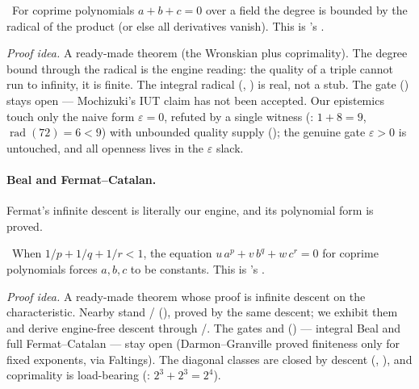 \begin{theorem}\label{thm:polynomial_abc_shadow}
\green{}\ For coprime polynomials $a+b+c=0$ over a field the degree is bounded by the radical of the
product (or else all derivatives vanish). This is 's .
\end{theorem}

\emph{Proof idea.} A ready-made  theorem (the Wronskian plus coprimality). The degree
bound through the radical is the engine reading: the quality of a triple cannot run to infinity, it
is finite. The integral radical (, ) is real, not a stub. The
gate  (\red{}) stays open --- Mochizuki's IUT claim has not been accepted. Our
epistemics touch only the naive form $\varepsilon=0$, refuted by a single witness
(: $1+8=9$, $\operatorname{rad}(72)=6<9$) with unbounded
quality supply (); the genuine gate $\varepsilon>0$ is
untouched, and all openness lives in the $\varepsilon$ slack.

\paragraph{Beal and Fermat–Catalan.}
Fermat's infinite descent is literally our engine, and its polynomial form is proved.

\begin{theorem}\label{thm:polynomial_fermat_catalan_shadow}
\green{}\ When $1/p+1/q+1/r<1$, the equation $u\,a^p+v\,b^q+w\,c^r=0$ for coprime polynomials forces
$a,b,c$ to be constants. This is 's .
\end{theorem}

\emph{Proof idea.} A ready-made  theorem whose proof is infinite descent on the
characteristic. Nearby stand / (),
proved by the same descent; we exhibit them and derive engine-free descent through
/. The gates  and
 (\red{}) --- integral Beal and full Fermat–Catalan --- stay open
(Darmon–Granville proved finiteness only for fixed exponents, via Faltings). The diagonal classes
are closed by descent (,
), and coprimality is load-bearing
(: $2^3+2^3=2^4$).

